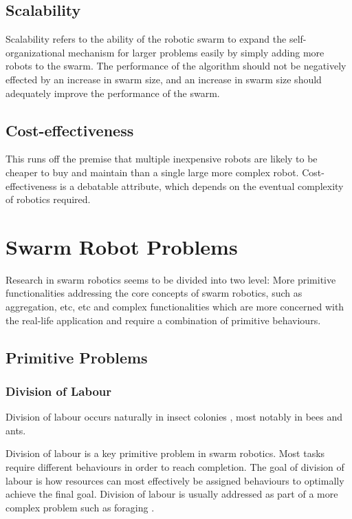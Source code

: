 \subsection{Scalability}
Scalability refers to the ability of the robotic swarm to expand the self-organizational mechanism for larger problems easily by simply adding more robots to the swarm. The performance of the algorithm should not be negatively effected by an increase in swarm size, and an increase in swarm size should adequately improve the performance of the swarm. 

\subsection{Cost-effectiveness}
This runs off the premise that multiple inexpensive robots are likely to be cheaper to buy and maintain than a single large more complex robot. Cost-effectiveness is a debatable attribute, which depends on the eventual complexity of robotics required. 

\section{Swarm Robot Problems}
\label{swarmrobotapplications}
Research in swarm robotics seems to be divided into two level: More primitive functionalities addressing the core concepts of swarm robotics, such as aggregation, etc, etc and complex functionalities which are more concerned with the real-life application and require a combination of primitive behaviours.

\subsection{Primitive Problems}

\subsubsection{Division of Labour}
Division of labour occurs naturally in insect colonies \cite{gautrais2002emergent}, most notably in bees and ants.

Division of labour is a key primitive problem  in swarm robotics. Most tasks require different behaviours in order to reach completion. The goal of division of labour is how resources can most effectively be assigned behaviours to optimally achieve the final goal. Division of labour is usually addressed as part of a more complex problem such as foraging \cite{jones2003adaptive}.
 
